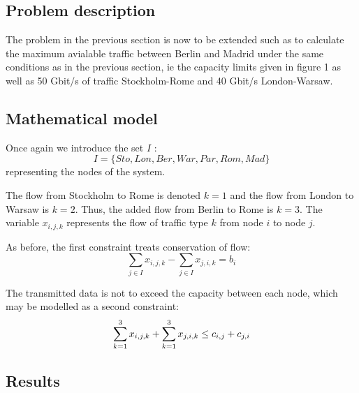 \subsection{Problem description}

The problem in the previous section is now to be extended such as to calculate the maximum  avialable traffic between Berlin and Madrid under the same conditions as in the previous section, ie the capacity limits given in figure 1 as well as 50 Gbit/s of traffic Stockholm-Rome and 40 Gbit/s London-Warsaw. 

\subsection{Mathematical model}
Once again we introduce the set $I$ :
$$I = \{ Sto,Lon,Ber,War,Par,Rom,Mad\}$$
representing the nodes of the system.

The flow from Stockholm to Rome is denoted $k=1$ and the flow from London to Warsaw is $k=2$. Thus, the added flow from Berlin to Rome is $k=3$. The variable $x_{i,j,k}$ represents the flow of traffic type $k$ from node $i$ to node $j$.

As before, the first constraint treats conservation of flow:
$$\sum\limits_{j \in I} x_{i,j,k} - \sum\limits_{j \in I} x_{j,i,k} = b_{i}$$

The transmitted data is not to exceed the capacity between each node, which may be modelled as a second constraint:
$$\sum\limits_{k =1}^3 x_{i,j,k} + \sum\limits_{k =1}^3 x_{j,i,k} \leq c_{i,j} + c_{j,i}\\$$

\subsection{Results}

